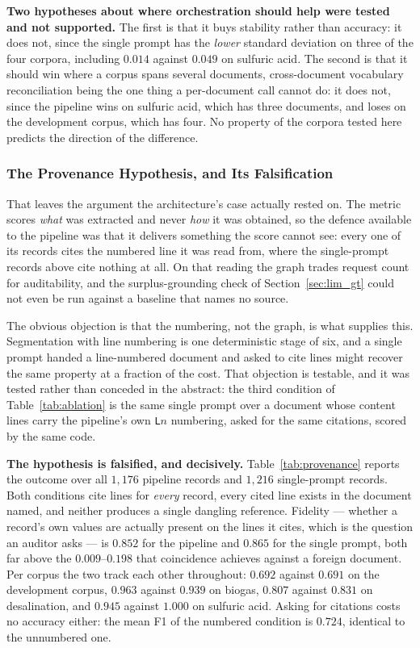 \documentclass[11pt]{article}
\begin{document}
\textbf{Two hypotheses about where orchestration should help were tested and not
supported.} The first is that it buys stability rather than accuracy: it does
not, since the single prompt has the \emph{lower} standard deviation on three of
the four corpora, including $0.014$ against $0.049$ on sulfuric acid. The second
is that it should win where a corpus spans several documents, cross-document
vocabulary reconciliation being the one thing a per-document call cannot do: it
does not, since the pipeline wins on sulfuric acid, which has three documents,
and loses on the development corpus, which has four. No property of the corpora
tested here predicts the direction of the difference.

\subsubsection{The Provenance Hypothesis, and Its Falsification}
\label{sec:provenance_falsified}

That leaves the argument the architecture's case actually rested on. The metric
scores \emph{what} was extracted and never \emph{how} it was obtained, so the
defence available to the pipeline was that it delivers something the score
cannot see: every one of its records cites the numbered line it was read from,
where the single-prompt records above cite nothing at all. On that reading the
graph trades request count for auditability, and the surplus-grounding check of
Section~\ref{sec:lim_gt} could not even be run against a baseline that names no
source.

The obvious objection is that the numbering, not the graph, is what supplies
this. Segmentation with line numbering is one deterministic stage of six, and a
single prompt handed a line-numbered document and asked to cite lines might
recover the same property at a fraction of the cost. That objection is testable,
and it was tested rather than conceded in the abstract: the third condition of
Table~\ref{tab:ablation} is the same single prompt over a document whose content
lines carry the pipeline's own \texttt{L}$n$ numbering, asked for the same
citations, scored by the same code.

\textbf{The hypothesis is falsified, and decisively.} Table~\ref{tab:provenance}
reports the outcome over all $1{,}176$ pipeline records and $1{,}216$
single-prompt records. Both conditions cite lines for \emph{every} record, every
cited line exists in the document named, and neither produces a single dangling
reference. Fidelity --- whether a record's own values are actually present on
the lines it cites, which is the question an auditor asks --- is $0.852$ for the
pipeline and $0.865$ for the single prompt, both far above the $0.009$--$0.198$
that coincidence achieves against a foreign document. Per corpus the two track
each other throughout: $0.692$ against $0.691$ on the development corpus,
$0.963$ against $0.939$ on biogas, $0.807$ against $0.831$ on desalination, and
$0.945$ against $1.000$ on sulfuric acid. Asking for citations costs no
accuracy either: the mean F1 of the numbered condition is $0.724$, identical to
the unnumbered one.
\end{document}

